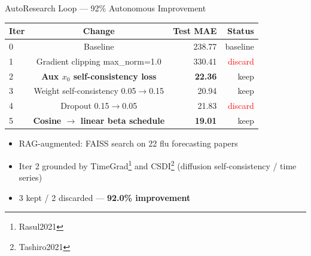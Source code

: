 \documentclass[10pt]{beamer}
\newcommand{\papercite}[1]{\footnote{\tiny #1}}
\begin{document}
\begin{frame}{AutoResearch Loop --- 92\% Autonomous Improvement}

  \centering
  \begin{tabular}{lcrr}
    \toprule
    Iter & Change & Test MAE & Status \\
    \midrule
    0 & Baseline & 238.77 & baseline \\
    1 & Gradient clipping max\_norm=1.0 & 330.41 & \textcolor{red}{discard} \\
    2 & \textbf{Aux $x_0$ self-consistency loss} & \textbf{22.36} & \textcolor{green!40!black}{keep} \\
    3 & Weight self-consistency 0.05$\to$0.15 & 20.94 & \textcolor{green!40!black}{keep} \\
    4 & Dropout 0.15$\to$0.05 & 21.83 & \textcolor{red}{discard} \\
    5 & \textbf{Cosine $\to$ linear beta schedule} & \textbf{19.01} & \textcolor{green!40!black}{keep} \\
    \bottomrule
  \end{tabular}

  \vspace{0.3cm}
  \begin{itemize}
    \item RAG-augmented: FAISS search on 22 flu forecasting papers
    \item Iter 2 grounded by TimeGrad\papercite{Rasul2021} and
          CSDI\papercite{Tashiro2021} (diffusion self-consistency / time series)
    \item 3 kept / 2 discarded --- \textbf{92.0\% improvement}
  \end{itemize}

\end{frame}
\end{document}
